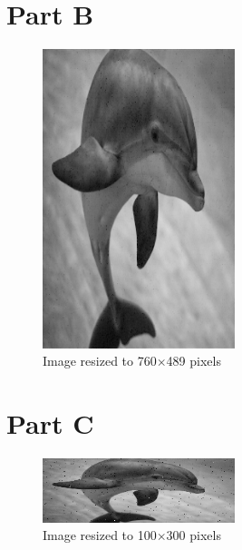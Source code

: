 \documentclass{article}
\begin{document}
\newpage
\section*{Part B}
\begin{figure}[H]
    \caption{Image resized to 760$\times$489 pixels}
    \centering
        \includegraphics[width=0.5\textwidth]{part-b.png}
\end{figure}



\newpage
\section*{Part C}
\begin{figure}[H]
    \caption{Image resized to 100$\times$300 pixels}
    \centering
        \includegraphics[width=0.5\textwidth]{part-c.png}
\end{figure}
\end{document}
